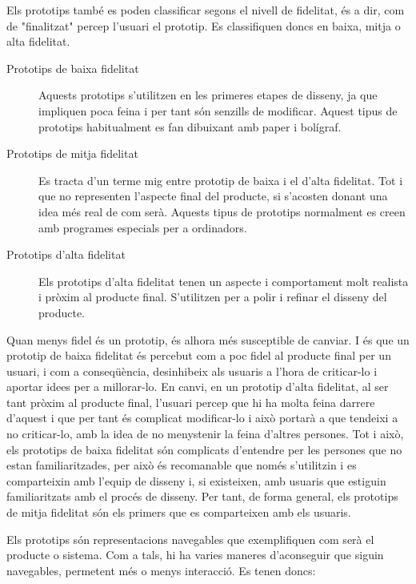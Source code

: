 Els prototips també es poden classificar segons el nivell de fidelitat, és a dir, com de "finalitzat" percep l'usuari el prototip. Es classifiquen doncs en baixa, mitja o alta fidelitat. 

\begin{description}
\item[Prototips de baixa fidelitat] Aquests prototips s'utilitzen en les primeres etapes de disseny, ja que impliquen poca feina i per tant són senzills de modificar. Aquest tipus de prototips habitualment es fan dibuixant amb paper i bolígraf. 
\item[Prototips de mitja fidelitat] Es tracta d'un terme mig entre prototip de baixa i el d'alta fidelitat. Tot i que no representen l'aspecte final del producte, si s'acosten donant una idea més real de com serà. Aquests tipus de prototips normalment es creen amb programes especials per a ordinadors.
\item[Prototips d'alta fidelitat] Els prototips d'alta fidelitat tenen un aspecte i comportament molt realista i pròxim al producte final. S'utilitzen per a polir i refinar el disseny del producte. 
\end{description}

Quan menys fidel és un prototip, és alhora més susceptible de canviar. I és que un prototip de baixa fidelitat és percebut com a poc fidel al producte final per un usuari, i com a conseqüència, desinhibeix als usuaris a l'hora de criticar-lo i aportar idees per a millorar-lo. En canvi, en un prototip d'alta fidelitat, al ser tant pròxim al producte final, l'usuari percep que hi ha molta feina darrere d'aquest i que per tant és complicat modificar-lo i això portarà a que tendeixi a no criticar-lo, amb la idea de no menystenir la feina d'altres persones. Tot i això, els prototips de baixa fidelitat són complicats d'entendre per les persones que no estan familiaritzades, per això és recomanable que només s'utilitzin i es comparteixin amb l'equip de disseny i, si existeixen, amb usuaris que estiguin familiaritzats amb el procés de disseny. Per tant, de forma general, els prototips de mitja fidelitat són els primers que es comparteixen amb els usuaris. 


Els prototips són representacions navegables que exemplifiquen com serà el producte o sistema. Com a tals, hi ha varies maneres d'aconseguir que siguin navegables, permetent més o menys interacció. Es tenen doncs:

